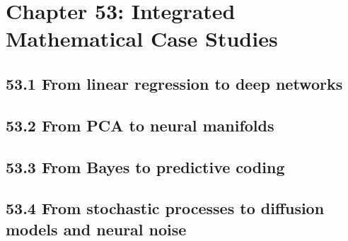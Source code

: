 \section{Chapter 53: Integrated Mathematical Case Studies}

\subsection{53.1 From linear regression to deep networks}

\subsection{53.2 From PCA to neural manifolds}

\subsection{53.3 From Bayes to predictive coding}

\subsection{53.4 From stochastic processes to diffusion models and neural noise}

\clearpage
